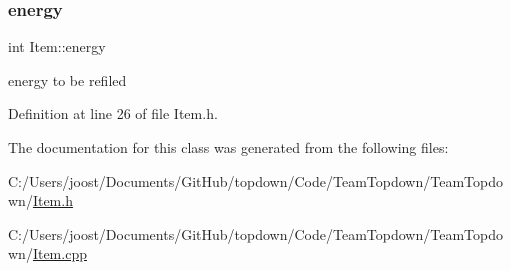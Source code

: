 \subsubsection{\texorpdfstring{energy}{energy}}
{\footnotesize\ttfamily int Item\+::energy}

energy to be refiled 

Definition at line 26 of file Item.\+h.



The documentation for this class was generated from the following files\+:\begin{DoxyCompactItemize}
\item 
C\+:/\+Users/joost/\+Documents/\+Git\+Hub/topdown/\+Code/\+Team\+Topdown/\+Team\+Topdown/\hyperlink{_item_8h}{Item.\+h}\item 
C\+:/\+Users/joost/\+Documents/\+Git\+Hub/topdown/\+Code/\+Team\+Topdown/\+Team\+Topdown/\hyperlink{_item_8cpp}{Item.\+cpp}\end{DoxyCompactItemize}
